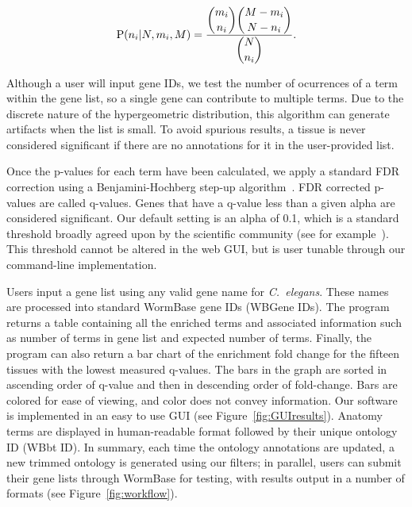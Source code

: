 \begin{eqnarray}\label{hypergeometric}
	\mathrm{P}(n_i | N, m_i, M) = \frac{\dbinom{m_i}{n_i}
  \dbinom{M-m_i}{N - n_i}}{\dbinom{N}{n_i}}\text{.}
\end{eqnarray}

Although a user will input gene IDs, we test the number of ocurrences of a term
within the gene list, so a single gene can contribute to multiple terms. Due to
the discrete nature of the hypergeometric distribution, this algorithm can
generate artifacts when the list is small. To avoid spurious results, a tissue is
never considered significant if there are no annotations for it in the
user-provided list.

Once the p-values for each term have been calculated, we apply a standard FDR
correction using a Benjamini-Hochberg step-up algorithm~\citep{Benjamini1995}.
FDR corrected p-values are called q-values. Genes that have a q-value less than
a given alpha are considered significant. Our default setting is an alpha of 0.1,
which is a standard threshold broadly agreed upon by the scientific community
(see for example~\citep{Love2014, Pawitan2005, Storey2003}). This threshold cannot
be altered in the web GUI, but is user tunable through our command-line
implementation.

Users input a gene list using any valid gene name for \emph{C.~elegans}. These
names are processed into standard WormBase gene IDs (WBGene IDs). The program
returns a table containing all the enriched terms and associated  information
such as number of terms in gene list and expected number of terms. Finally, the
program can also return a bar chart of the enrichment fold change for the fifteen
tissues with the lowest measured q-values. The bars in the graph are sorted in
ascending order of q-value and then in descending order of fold-change. Bars are
colored for ease of viewing, and color does not convey information. Our software
is implemented in an easy to use GUI (see Figure~\ref{fig:GUIresults}). Anatomy
terms are displayed in human-readable format followed by their unique ontology
ID (WBbt ID). In summary, each time the ontology annotations are updated, a new
trimmed ontology is generated using our filters; in parallel, users can submit
their gene lists through WormBase for testing, with results output in a number
of formats (see Figure~\ref{fig:workflow}).

